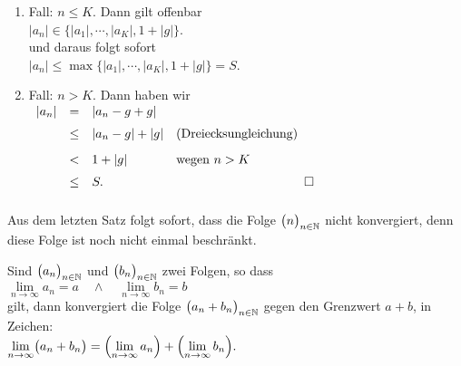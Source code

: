 \begin{enumerate}
\item Fall: $n \leq K$.  Dann gilt offenbar 
      \\[0.2cm]
      \hspace*{1.3cm}      
      $|a_n| \in \bigl\{ |a_1|, \cdots, |a_K|, 1 + |g| \bigr\}$.
      \\[0.2cm]
      und daraus folgt sofort
      \\[0.2cm]
      \hspace*{1.3cm}      
      $|a_n| \leq \max\bigl\{ |a_1|, \cdots, |a_K|, 1 + |g| \bigr\} = S$.
\item Fall: $n > K$.  Dann haben wir
      \\[0.2cm]
      \hspace*{1.3cm}
$
      \begin{array}[b]{lcll}        
         |a_n| & =    & | a_n - g + g | \\[0.2cm]
               & \leq & | a_n - g | + |g| 
                      & \mbox{(Dreiecksungleichung)} \\[0.3cm]
               & <    & 1 + |g|           & \mbox{wegen $n>K$} \\[0.2cm]
               & \leq & S. \\[0.2cm]
      \end{array} \hspace*{\fill} \Box
      $
\end{enumerate}

\example
Aus dem letzten Satz folgt sofort, dass die Folge $\bigl(n\bigr)_{n\in\mathbb{N}}$ nicht
konvergiert, denn diese Folge ist noch nicht einmal beschr\"ankt.  \eox
\pagebreak

\begin{Satz}
Sind $\bigl(a_n\bigr)_{n\in\mathbb{N}}$ und $\bigl(b_n\bigr)_{n\in\mathbb{N}}$ zwei Folgen, so dass
\\[0.2cm]
\hspace*{1.3cm}
$ \lim\limits_{n\rightarrow\infty} a_n = a \quad \wedge \quad \lim\limits_{n\rightarrow\infty} b_n = b $
\\[0.2cm]
gilt, dann konvergiert die Folge $\bigl(a_n + b_n\bigr)_{n\in\mathbb{N}}$ gegen den Grenzwert $a+b$, in
Zeichen:
\\[0.2cm]
\hspace*{1.3cm}
$ \lim\limits_{n\rightarrow\infty} \bigl(a_n + b_n\bigr) = 
   \Bigl(\lim\limits_{n\rightarrow\infty} a_n\Bigr) +\Bigl(\lim\limits_{n\rightarrow\infty} b_n\Bigr).
$
\end{Satz}

